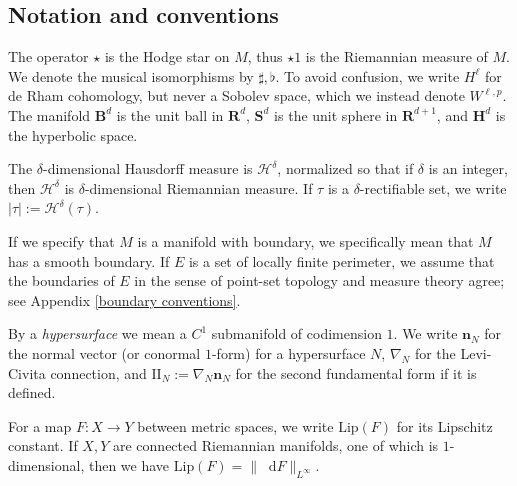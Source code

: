 \documentclass[reqno,11pt]{amsart}
\newcommand{\RR}{\mathbf{R}}
\newcommand{\Hyp}{\mathbf H}
\newcommand{\Sph}{\mathbf S}
\newcommand{\Ball}{\mathbf{B}}
\newcommand*\dif{\mathop{}\!\mathrm{d}}
\newcommand{\Two}{\mathrm{I\!I}}
\newcommand{\normal}{\mathbf n}
\newcommand{\Lip}{\mathrm{Lip}}
\newcommand{\dfn}[1]{\emph{#1}\index{#1}}
\theoremstyle{definition}
\numberwithin{equation}{section}
\begin{document}

\subsection{Notation and conventions}
The operator $\star$ is the Hodge star on $M$, thus $\star 1$ is the Riemannian measure of $M$.
We denote the musical isomorphisms by $\sharp, \flat$.
To avoid confusion, we write $H^\ell$ for de Rham cohomology, but never a Sobolev space, which we instead denote $W^{\ell, p}$.
The manifold $\Ball^d$ is the unit ball in $\RR^d$, $\Sph^d$ is the unit sphere in $\RR^{d + 1}$, and $\Hyp^d$ is the hyperbolic space.

The $\delta$-dimensional Hausdorff measure is $\mathcal H^\delta$, normalized so that if $\delta$ is an integer, then $\mathcal H^\delta$ is $\delta$-dimensional Riemannian measure.
If $\tau$ is a $\delta$-rectifiable set, we write $|\tau| := \mathcal H^\delta(\tau)$.

If we specify that $M$ is a manifold with boundary, we specifically mean that $M$ has a smooth boundary.
If $E$ is a set of locally finite perimeter, we assume that the boundaries of $E$ in the sense of point-set topology and measure theory agree; see Appendix \ref{boundary conventions}.

By a \dfn{hypersurface} we mean a $C^1$ submanifold of codimension $1$.
We write $\normal_N$ for the normal vector (or conormal $1$-form) for a hypersurface $N$, $\nabla_N$ for the Levi-Civita connection, and $\Two_N := \nabla_N \normal_N$ for the second fundamental form if it is defined.

For a map $F: X \to Y$ between metric spaces, we write $\Lip(F)$ for its Lipschitz constant.
If $X, Y$ are connected Riemannian manifolds, one of which is $1$-dimensional, then we have $\Lip(F) = \|\dif F\|_{L^\infty}$.

\end{document}
